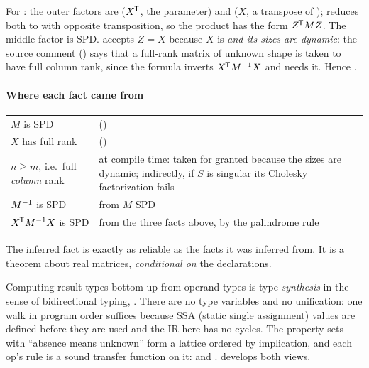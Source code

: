 For : the outer factors are 
(\(X^{\mkern-1.5mu\mathsf{T}}\), the parameter) and  (\(X\), a transpose of
);  reduces both to  with opposite
transposition, so the product has the form \(Z^{\mkern-1.5mu\mathsf{T}} M Z\). The middle factor
 is SPD.  accepts \(Z = X\) because \(X\) is
 \emph{and its sizes are dynamic}: the source comment
() says that a full-rank matrix of
unknown shape is taken to have full column rank, since the formula inverts
\(X^{\mkern-1.5mu\mathsf{T}} M^{-1} X\) and needs it. Hence .

\paragraph{Where each fact came from}
\begin{center}\small
\begin{tabularx}{\linewidth}{@{}lL@{}}
\toprule
\(M\) is SPD & \Odecl{} () \\
\(X\) has full rank & \Odecl{} () \\
\(n \ge m\), i.e.\ full \emph{column} rank & \Onone{} at compile time: taken for granted because the sizes are dynamic; \Orun{} indirectly, if \(S\) is singular its Cholesky factorization fails \\
\(M^{-1}\) is SPD & \Oinf{} from \(M\) SPD \\
\(X^{\mkern-1.5mu\mathsf{T}} M^{-1} X\) is SPD & \Oinf{} from the three facts above, by the palindrome rule \\
\bottomrule
\end{tabularx}
\end{center}

The inferred fact is exactly as reliable as the facts it was inferred from.
It is a theorem about real matrices, \emph{conditional on} the declarations.

\begin{theory}
Computing result types bottom-up from operand types is type
\emph{synthesis} in the sense of bidirectional typing,
. There are no type variables and no unification: one walk
in program order suffices because SSA (static single assignment) values are defined before they are
used and the IR here has no cycles. The property sets with
``absence means unknown'' form a lattice ordered by implication, and each
op's rule is a sound transfer function on it:  and .
 develops both views.
\end{theory}

